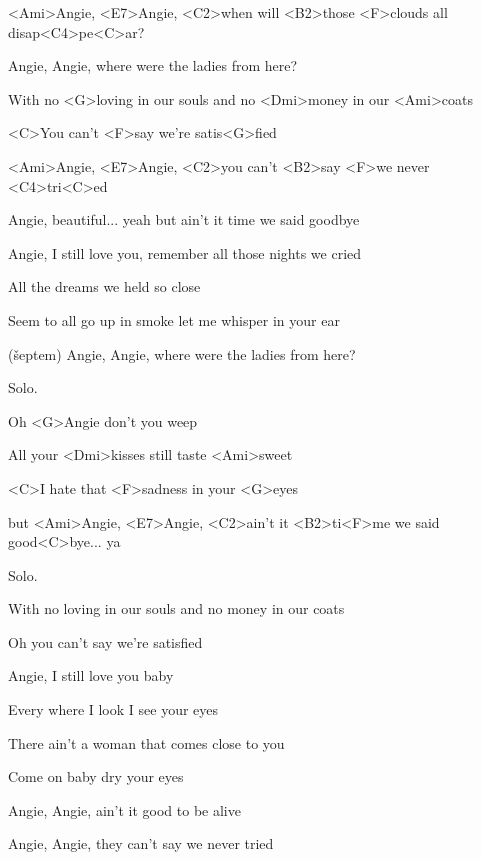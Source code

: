 

\zs
<Ami>Angie, <E7>Angie, <C2>when will <B2>those <F>clouds all disap<C4>pe<C>ar?

Angie, Angie, where were the ladies from here?
\ks

\zr
With no <G>loving in our souls and no <Dmi>money in our <Ami>coats

<C>You can't <F>say we're satis<G>fied

<Ami>Angie, <E7>Angie, <C2>you can't <B2>say <F>we never <C4>tri<C>ed
\kr

\zs
Angie, beautiful... yeah but ain't it time we said goodbye

Angie, I still love you, remember all those nights we cried
\ks

\zr
All the dreams we held so close

Seem to all go up in smoke let me whisper in your ear

(šeptem) Angie, Angie, where were the ladies from here?
\kr

Solo.

\zr
Oh <G>Angie don't you weep

All your <Dmi>kisses still taste <Ami>sweet

<C>I hate that <F>sadness in your <G>eyes

but <Ami>Angie, <E7>Angie, <C2>ain't it <B2>ti<F>me we said good<C>bye... ya
\kr

Solo.

\zr
With no loving in our souls
and no money in our coats

Oh you can't say we're satisfied
\kr

\zs
Angie, I still love you baby

Every where I look I see your eyes
\ks

\zs
There ain't a woman that comes close to you

Come on baby dry your eyes

Angie, Angie, ain't it good to be alive

Angie, Angie, they can't say we never tried
\ks

\kp





